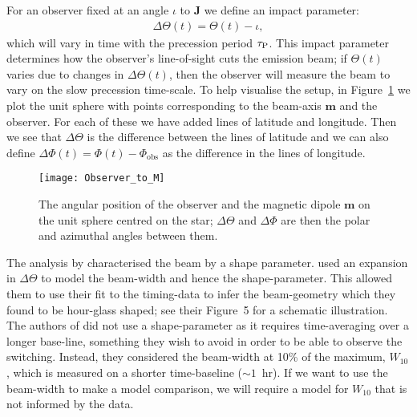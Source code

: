 \documentclass[../full_thesis/full_thesis.tex]{subfiles}
\begin{document}
For an observer fixed at an angle $\iota$ to $\textbf{J}$ we define an impact parameter:
\begin{align}
\label{eqn:Delta_Theta_definition}
\Delta\Theta(t) = \Theta(t) - \iota ,
\end{align}
which will vary in time with the precession period $\tau_{\mathrm{P}}$.  This impact
parameter determines how the observer's line-of-sight cuts the emission beam;
if $\Theta(t)$ varies due to changes in $\Delta\Theta(t)$, then the observer
will measure the beam to vary on the slow precession time-scale. To help visualise the setup, in
Figure~\ref{fig: delta theta delta phi} we plot the unit sphere with points
corresponding to the beam-axis $\mathbf{m}$ and the observer. For each of these
we have added lines of latitude and longitude. Then we see that
$\Delta\Theta$ is the difference between the lines of latitude and we can also
define $\Delta\Phi(t) = \Phi(t) - \Phi_{\textrm{obs}}$ as the difference in the
lines of longitude.
\begin{figure}[htb]
\centering
\texttt{[image: Observer\_to\_M]}
\caption{The angular position of the observer and the magnetic dipole
         $\mathbf{m}$ on the unit sphere centred on the star; $\Delta\Theta$
         and $\Delta\Phi$ are then the polar and azimuthal angles between
         them.}
\label{fig: delta theta delta phi}
\end{figure}


The analysis by \citet{Stairs2000} characterised the beam by a shape parameter.
\citet{Link2001} used an expansion in $\Delta\Theta$ to model the beam-width
and hence the shape-parameter. This allowed them to use their fit to the
timing-data to infer the beam-geometry which they found to be hour-glass
shaped; see their Figure~5 for a schematic illustration.   The authors of
\citet{Lyne2010} did not use a shape-parameter as it requires time-averaging
over a longer base-line, something they wish to avoid in order to be able to
observe the switching. Instead, they considered the beam-width at 10\% of the
maximum, $W_{10}$, which is measured on a shorter time-baseline ($\sim1$~hr).
If we want to use the beam-width to make a model comparison, we will require a
model for $W_{10}$ that is not informed by the data.
\end{document}
